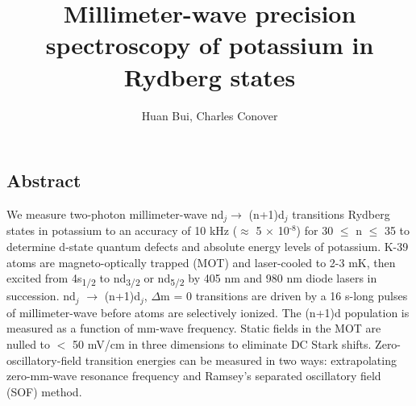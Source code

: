 \documentclass[landscape]{sciposter}
\title{Millimeter-wave precision spectroscopy of potassium in Rydberg states}
\author{Huan Bui, Charles Conover}
\institute{Department of Physics and Astronomy, Colby College, Waterville, Maine}
\begin{document}
\renewcommand{\titlesize}{\fontsize{60 pt}{75 pt}\selectfont}
\renewcommand{\authorsize}{\fontsize{38 pt}{45 pt}\selectfont}
\renewcommand{\instsize}{\fontsize{38 pt}{45 pt}\selectfont}
\maketitle

\fontsize{30 pt}{38 pt}\selectfont

\begin{multicols}{4}
\setlength{\columnseprule}{0pt}

\section*{\large Abstract}
{\normalfont We measure two-photon millimeter-wave nd$_j \to$ (n+1)d$_j$ transitions Rydberg states in potassium to an accuracy of 10 kHz ($\approx$ 5 $\times$ 10$^{\text{-8}}$) for 30 $\leq$ n $\leq$ 35 to determine d-state quantum defects and absolute energy levels of potassium. K-39 atoms are magneto-optically trapped (MOT) and laser-cooled to 2-3 mK, then excited from 4s\textsubscript{1/2} to nd\textsubscript{3/2} or nd\textsubscript{5/2} by 405 nm and 980 nm diode lasers in succession. nd$_j$ $\rightarrow$ (n+1)d$_j$, $\Delta$m = 0 transitions are driven by a 16 \textmu s-long pulses of millimeter-wave before atoms are selectively ionized. The (n+1)d population is measured as a function of mm-wave frequency. Static fields in the MOT are nulled to $<$ 50 mV/cm in three dimensions to eliminate DC Stark shifts. Zero-oscillatory-field transition energies can be measured in two ways: extrapolating zero-mm-wave resonance frequency and Ramsey's separated oscillatory field (SOF) method.}


\end{multicols}
\end{document}
